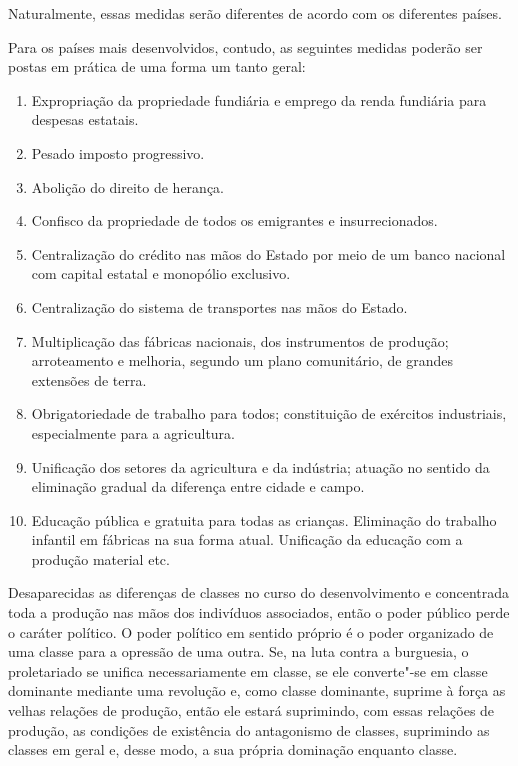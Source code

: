 Naturalmente, essas medidas serão diferentes de acordo com os diferentes
países.

Para os países mais desenvolvidos, contudo, as seguintes medidas poderão
ser postas em prática de uma forma um tanto geral:

\begin{enumerate}
\item Expropriação da propriedade fundiária e emprego da renda fundiária
para despesas \mbox{estatais.} 

\item Pesado imposto progressivo. 

\item Abolição do direito de herança.

\item Confisco da propriedade de todos os emigrantes e insurrecionados. 

\item Centralização do crédito nas mãos do Estado por meio de um banco
nacional com capital estatal e monopólio exclusivo.

\item Centralização do sistema de transportes nas mãos do Estado. 

\item Multiplicação das fábricas nacionais, dos instrumentos de produção;
arroteamento e melhoria, segundo um plano comunitário, de grandes
extensões de terra. 

\item Obrigatoriedade de trabalho para todos; constituição de exércitos
industriais, especialmente para a agricultura. 

\item Unificação dos setores da agricultura e da indústria; atuação no
sentido da eliminação gradual da diferença entre cidade e campo. 

\item Educação pública e gratuita para todas as crianças. Eliminação do
trabalho infantil em fábricas na sua forma atual. Unificação da
educação com a produção material etc.
\end{enumerate}

Desaparecidas as diferenças de classes no curso do desenvolvimento e
concentrada toda a produção nas mãos dos indivíduos associados, então o
poder público perde o caráter político. O poder político em sentido
próprio é o poder organizado de uma classe para a opressão de uma
outra. Se, na luta contra a burguesia, o proletariado se unifica
necessariamente em classe, se ele converte"-se em classe dominante
mediante uma revolução e, como classe dominante, suprime à força as
velhas relações de produção, então ele estará suprimindo, com essas
relações de produção, as condições de existência do antagonismo de
classes, suprimindo as classes em geral e, desse modo, a sua própria
dominação enquanto classe.

